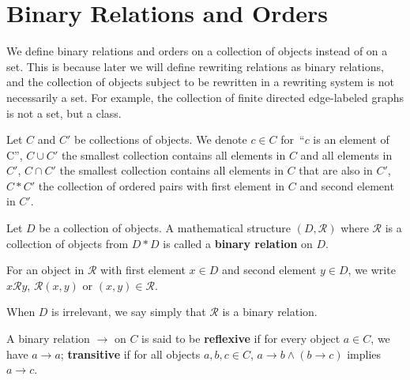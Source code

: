 
\chapter{Binary Relations and Orders}

We define binary relations and orders on a collection of objects instead of on a set. This is because later we will define rewriting relations as binary relations, and the collection of objects subject to be rewritten in a rewriting system is not necessarily a set. For example, the collection of finite directed edge-labeled graphs is not a set, but a class.

\begin{notation}
    Let $C$ and $C'$ be collections of objects. We denote $c \mathop{\in} C$ for~\enquote{$c$ is an element of C}, $C \mathop{\cup} C'$ the smallest collection contains all elements in $C$ and all elements in $C'$, $C \mathop{\cap} C'$ the smallest collection contains all elements in $C$ that are also in $C'$, $C * C'$ the collection of ordered pairs with first element in $C$ and second element in $C'$.  
  \end{notation} 
  
  \begin{definition}
    \label{def:binary_relation:binary_relation}
    Let $D$ be a collection of objects. A mathematical structure \( (D, \mathcal{R}) \) where $\mathcal{R}$ is a collection of objects from $D * D$ is called a \textbf{binary relation} on $D$. 
    
    For an object in $\mathcal{R}$ with first element $x \mathop{\in} D$ and second element $y\in D$, we write $x \mathcal{R} y$, $\mathcal{R}(x,y)$ or $(x,y) \mathop{\in} \mathcal{R}$. 
    
    When $D$ is irrelevant, we say simply that $\mathcal{R}$ is a binary relation.
  \end{definition} 
   
  \begin{definition}
    \label{def:binary_relation:reflexivity_transitivity}
    A binary relation \( \mathop{\to} \) on \(C\) is said to be \textbf{reflexive} if for every object \(a \mathop{\in} C\), we have \(a \mathop{\to} a\); \textbf{transitive} if for all objects \( a, b, c \mathop{\in} C\), \( a \mathop{\to} b \mathop{\land} (b \mathop{\to} c) \) implies \(a \mathop{\to} c\).
  \end{definition}
  
